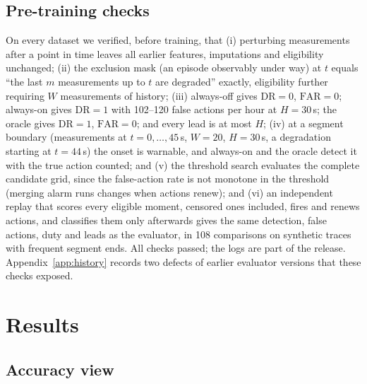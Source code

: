 \documentclass[preprint,review,12pt]{elsarticle}
\newcommand{\FAR}{\mathrm{FAR}}
\newcommand{\DR}{\mathrm{DR}}
\begin{document}
\subsection{Pre-training checks}
\label{sec:checks}
On every dataset we verified, before training, that (i) perturbing measurements
after a point in time leaves all earlier features, imputations and eligibility
unchanged; (ii) the exclusion mask (an episode observably under way) at $t$ equals
``the last $m$ measurements up to $t$ are degraded'' exactly, eligibility further
requiring $W$ measurements of history; (iii) always-off gives $\DR=0$, $\FAR=0$;
always-on gives $\DR=1$ with 102--120 false actions per hour at $H=30$\,s; the oracle
gives $\DR=1$, $\FAR=0$; and every lead is at most $H$; (iv) at a segment boundary
(measurements at $t=0,\dots,45$\,s, $W=20$, $H=30$\,s, a degradation starting at
$t=44$\,s) the onset is warnable, and always-on and the oracle detect it with the
true action counted; and (v) the threshold search evaluates the complete candidate
grid, since the false-action rate is not monotone in the threshold (merging alarm
runs changes when actions renew); and (vi) an independent replay that scores every
eligible moment, censored ones included, fires and renews actions, and classifies them
only afterwards gives the same detection, false actions, duty and leads as the
evaluator, in 108 comparisons on synthetic traces with frequent segment ends. All checks passed; the logs are part of the
release. Appendix~\ref{app:history} records two defects of earlier evaluator versions
that these checks exposed.

\section{Results}
\label{sec:results}

\subsection{Accuracy view}
\end{document}
